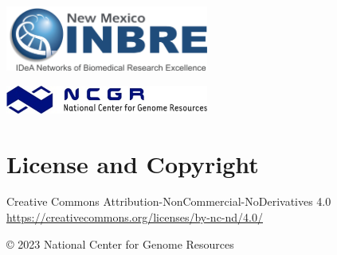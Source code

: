 \documentclass[
]{book}
\begin{document}
\includegraphics[width=0.5\textwidth,height=\textheight]{./Figures/INBRE_Logo_Grad_transparent-2019.png}

\includegraphics[width=0.5\textwidth,height=\textheight]{./Figures/ncgr.png}

\hypertarget{license-and-copyright-1}{%
\chapter{License and Copyright}\label{license-and-copyright-1}}

Creative Commons Attribution-NonCommercial-NoDerivatives 4.0
\url{https://creativecommons.org/licenses/by-nc-nd/4.0/}

© 2023 National Center for Genome Resources

  
\end{document}
